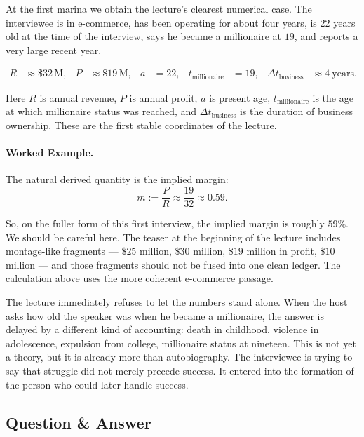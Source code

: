 At the first marina we obtain the lecture's clearest numerical case. The interviewee is in e-commerce, has been operating for about four years, is $22$ years old at the time of the interview, says he became a millionaire at $19$, and reports a very large recent year.

\begin{align}
R &\approx \$32\,\mathrm{M}, &
P &\approx \$19\,\mathrm{M}, &
a &= 22, &
t_{\text{millionaire}} &= 19, &
\Delta t_{\text{business}} &\approx 4\ \mathrm{years}.
\end{align}

Here \(R\) is annual revenue, \(P\) is annual profit, \(a\) is present age, \(t_{\text{millionaire}}\) is the age at which millionaire status was reached, and \(\Delta t_{\text{business}}\) is the duration of business ownership. These are the first stable coordinates of the lecture.

\paragraph{Worked Example.}
The natural derived quantity is the implied margin:
\begin{equation}
m := \frac{P}{R} \approx \frac{19}{32} \approx 0.59.
\end{equation}

So, on the fuller form of this first interview, the implied margin is roughly \(59\%\). We should be careful here. The teaser at the beginning of the lecture includes montage-like fragments --- \(\$25\) million, \(\$30\) million, \(\$19\) million in profit, \(\$10\) million --- and those fragments should not be fused into one clean ledger. The calculation above uses the more coherent e-commerce passage.

The lecture immediately refuses to let the numbers stand alone. When the host asks how old the speaker was when he became a millionaire, the answer is delayed by a different kind of accounting: death in childhood, violence in adolescence, expulsion from college, millionaire status at nineteen. This is not yet a theory, but it is already more than autobiography. The interviewee is trying to say that struggle did not merely precede success. It entered into the formation of the person who could later handle success.

\subsection{Question \& Answer}

